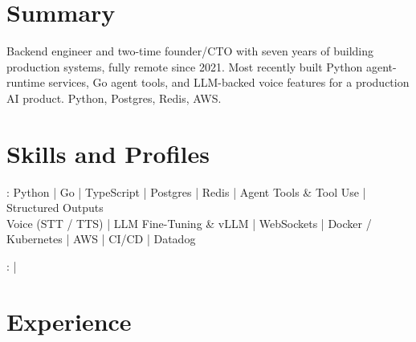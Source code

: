 \documentclass[print]{jack-resume}
\begin{document}
\pagecolor{darkmodeBackground}


\begin{minipage}[t][1cm][t]{.03\textwidth}
    \hfill
\end{minipage}

\section{Summary}
Backend engineer and two-time founder/CTO with seven years of building production systems, fully remote since 2021. Most recently built Python agent-runtime services, Go agent tools, and LLM-backed voice features for a production AI product. Python, Postgres, Redis, AWS.
\sectionsep

\section{Skills and Profiles}
:
Python \hfill | \hfill
Go \hfill | \hfill
TypeScript \hfill | \hfill
Postgres \hfill | \hfill
Redis \hfill | \hfill
Agent Tools \& Tool Use \hfill | \hfill
Structured Outputs \\
\hspace{1.0cm} Voice (STT / TTS) \hfill | \hfill
LLM Fine-Tuning \& vLLM \hfill | \hfill
WebSockets \hfill | \hfill
Docker / Kubernetes \hfill | \hfill
AWS \hfill | \hfill
CI/CD \hfill | \hfill
Datadog \\

\raggedright{
    :
      \href{https://www.linkedin.com/in/jack-sturtevant/}{ \ExternalLink} |
     \href{https://github.com/jacksturt}{ \ExternalLink}}

\section{Experience}
\end{document}
